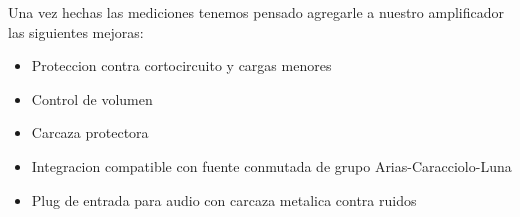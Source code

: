 \documentclass[a4paper,12pt,twoside]{article}
\begin{document}
Una vez hechas las mediciones tenemos pensado agregarle a nuestro amplificador las siguientes mejoras:
\begin{itemize}
\item{Proteccion contra cortocircuito y cargas menores}
\item{Control de volumen}
\item{Carcaza protectora}
\item{Integracion compatible con fuente conmutada de grupo Arias-Caracciolo-Luna}
\item{Plug de entrada para audio con carcaza metalica contra ruidos}
\end{itemize}
\end{document}
